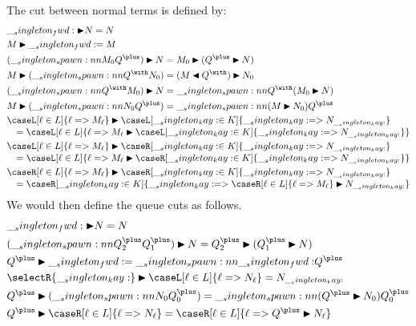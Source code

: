 The cut between normal terms is defined by:
\begin{equation*}
  \begin{lgathered}
    \nspawn{\fwd}{N} = N \\
    \nspawn{M}{\fwd} = M \\
    \nspawn{(\spawn{M_0}{Q^{\plus}})}{N}
      = \nspawn{M_0}{(\qpspawn{Q^{\plus}}{N})} \\
    \nspawn{M}{(\spawn{Q^{\with}}{N_0})}
      = \nspawn{(\qwspawn{M}{Q^{\with}})}{N_0} \\
    \nspawn{(\spawn{Q^{\with}}{M_0})}{N}
      = \spawn{Q^{\with}}{(\nspawn{M_0}{N})} \\
    \nspawn{M}{(\spawn{N_0}{Q^{\plus}})}
      = \spawn{(\nspawn{M}{N_0})}{Q^{\plus}} \\
    \nspawn{\caseL[\ell \in L]{\ell => M_{\ell}}}
           {\caseL[\kay \in K]{\kay => N_{\kay}}} \\[-.75\jot]\quad
      = \caseL[\ell \in L]{\ell =>
          \nspawn{M_{\ell}}{\caseL[\kay \in K]{\kay => N_{\kay}}}} \\
    \nspawn{\caseL[\ell \in L]{\ell => M_{\ell}}}
           {\caseR[\kay \in K]{\kay => N_{\kay}}} \\[-.75\jot]\quad
      = \caseL[\ell \in L]{\ell =>
          \nspawn{M_{\ell}}{\caseR[\kay \in K]{\kay => N_{\kay}}}} \\
    \nspawn{\caseR[\ell \in L]{\ell => M_{\ell}}}
           {\caseR[\kay \in K]{\kay => N_{\kay}}} \\[-.75\jot]\quad
      = \caseR[\kay \in K]{\kay =>
          \nspawn{\caseR[\ell \in L]{\ell => M_{\ell}}}{N_{\kay}}}
  \end{lgathered}
\end{equation*}
We would then define the queue cuts as follows.
\begin{equation*}
  \begin{lgathered}
    \qpspawn{\fwd}{N} = N \\
    \qpspawn{(\spawn{Q^{\plus}_2}{Q^{\plus}_1})}{N}
      = \qpspawn{Q^{\plus}_2}{(\qpspawn{Q^{\plus}_1}{N})} \\
    \qpspawn{Q^{\plus}}{\fwd} = \spawn{\fwd}{Q^{\plus}} \\
    \qpspawn{\selectR{\kay}}{\caseL[\ell \in L]{\ell => N_{\ell}}} = N_{\kay} \\
    \qpspawn{Q^{\plus}}{(\spawn{N_0}{Q^{\plus}_0})}
      = \spawn{(\qpspawn{Q^{\plus}}{N_0})}{Q^{\plus}_0} \\
    \qpspawn{Q^{\plus}}{\caseR[\ell \in L]{\ell => N_{\ell}}}
      = \caseR[\ell \in L]{\ell => \qpspawn{Q^{\plus}}{N_{\ell}}} \\
  \end{lgathered}
\end{equation*}
